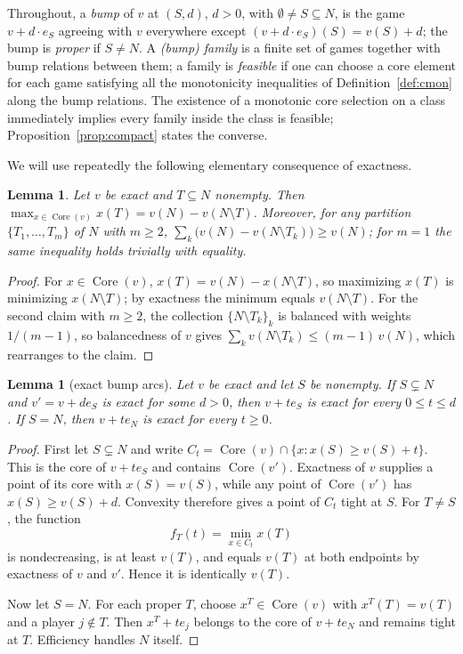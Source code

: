 \documentclass[11pt]{article}
\newtheorem{lemma}[theorem]{Lemma}
\newcommand{\core}{\operatorname{Core}}
\begin{document}
Throughout, a \emph{bump} of $v$ at $(S,d)$, $d>0$, with
$\emptyset\neq S\subseteq N$, is the game $v+d\cdot e_S$ agreeing with $v$
everywhere except $(v+d\cdot e_S)(S)=v(S)+d$; the bump is \emph{proper} if
$S\neq N$. A \emph{(bump) family} is a finite set of games
together with bump relations between them; a family is \emph{feasible} if
one can choose a core element for each game satisfying all the monotonicity
inequalities of Definition~\ref{def:cmon} along the bump relations. The
existence of a monotonic core selection on a class immediately implies every
family inside the class is feasible; Proposition~\ref{prop:compact} states
the converse.

We will use repeatedly the following elementary consequence of exactness.

\begin{lemma}\label{lem:facebound}
Let $v$ be exact and $T\subseteq N$ nonempty. Then
$\max_{x\in\core(v)}x(T)=v(N)-v(N\setminus T)$. Moreover, for any partition
$\{T_1,\dots,T_m\}$ of $N$ with $m\ge 2$,
$\sum_k\bigl(v(N)-v(N\setminus T_k)\bigr)\ge v(N)$; for $m=1$ the same
inequality holds trivially with equality.
\end{lemma}

\begin{proof}
For $x\in\core(v)$, $x(T)=v(N)-x(N\setminus T)$, so maximizing $x(T)$ is
minimizing $x(N\setminus T)$; by exactness the minimum equals
$v(N\setminus T)$. For the second claim with $m\ge2$, the collection
$\{N\setminus T_k\}_k$ is balanced with weights $1/(m-1)$, so balancedness
of $v$ gives $\sum_k v(N\setminus T_k)\le(m-1)\,v(N)$, which rearranges to
the claim.
\end{proof}

\begin{lemma}[exact bump arcs]\label{lem:exact-arcs}
Let $v$ be exact and let $S$ be nonempty. If $S\subsetneq N$ and
$v'=v+d e_S$ is exact for some $d>0$, then $v+t e_S$ is exact for every
$0\leq t\leq d$. If $S=N$, then $v+t e_N$ is exact for every $t\geq0$.
\end{lemma}

\begin{proof}
First let $S\subsetneq N$ and write
$C_t=\core(v)\cap\{x:x(S)\geq v(S)+t\}$. This is the core of
$v+t e_S$ and contains $\core(v')$. Exactness of $v$ supplies a point of
its core with $x(S)=v(S)$, while any point of $\core(v')$ has
$x(S)\geq v(S)+d$. Convexity therefore gives a point of $C_t$ tight at
$S$. For $T\neq S$, the function
\[
 f_T(t)=\min_{x\in C_t}x(T)
\]
is nondecreasing, is at least $v(T)$, and equals $v(T)$ at both endpoints
by exactness of $v$ and $v'$. Hence it is identically $v(T)$.

Now let $S=N$. For each proper $T$, choose
$x^T\in\core(v)$ with $x^T(T)=v(T)$ and a player $j\notin T$.
Then $x^T+t e_j$ belongs to the core of $v+t e_N$ and remains tight at
$T$. Efficiency handles $N$ itself.
\end{proof}
\end{document}
